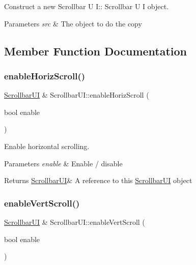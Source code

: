Construct a new Scrollbar U I\+:\+: Scrollbar U I object. 


\begin{DoxyParams}{Parameters}
{\em src} & The object to do the copy \\
\hline
\end{DoxyParams}


\subsection{Member Function Documentation}
\mbox{\label{class_scrollbar_u_i_aa7e2e95bfbbc527f72b7576601d08944}} 
\subsubsection{\texorpdfstring{enable\+Horiz\+Scroll()}{enableHorizScroll()}}
{\footnotesize\ttfamily \hyperlink{class_scrollbar_u_i}{Scrollbar\+UI} \& Scrollbar\+U\+I\+::enable\+Horiz\+Scroll (\begin{DoxyParamCaption}\item[{bool}]{enable }\end{DoxyParamCaption})}



Enable horizontal scrolling. 


\begin{DoxyParams}{Parameters}
{\em enable} & Enable / disable \\
\hline
\end{DoxyParams}
\begin{DoxyReturn}{Returns}
\hyperlink{class_scrollbar_u_i}{Scrollbar\+UI}\& A reference to \textquotesingle{}this\textquotesingle{} \hyperlink{class_scrollbar_u_i}{Scrollbar\+UI} object 
\end{DoxyReturn}
\mbox{\label{class_scrollbar_u_i_a3e782056929dbee685c09abfdbcf6473}} 
\subsubsection{\texorpdfstring{enable\+Vert\+Scroll()}{enableVertScroll()}}
{\footnotesize\ttfamily \hyperlink{class_scrollbar_u_i}{Scrollbar\+UI} \& Scrollbar\+U\+I\+::enable\+Vert\+Scroll (\begin{DoxyParamCaption}\item[{bool}]{enable }\end{DoxyParamCaption})}



